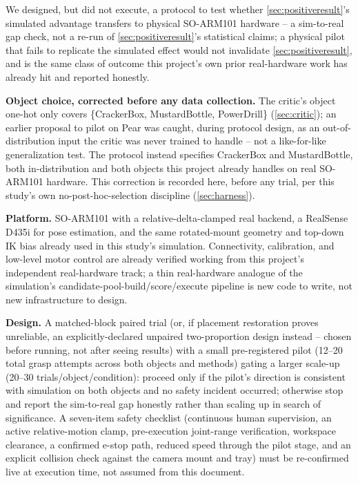 \documentclass[journal]{IEEEtran}
\begin{document}
We designed, but did not execute, a protocol to test whether
\cref{sec:positiveresult}'s simulated advantage transfers to physical
SO-ARM101 hardware -- a sim-to-real gap check, not a re-run of
\cref{sec:positiveresult}'s statistical claims; a physical pilot that fails
to replicate the simulated effect would not invalidate
\cref{sec:positiveresult}, and is the same class of outcome this project's
own prior real-hardware work has already hit and reported honestly.

\textbf{Object choice, corrected before any data collection.} The critic's
object one-hot only covers \{CrackerBox, MustardBottle, PowerDrill\}
(\cref{sec:critic}); an earlier proposal to pilot on Pear was caught,
during protocol design, as an out-of-distribution input the critic was
never trained to handle -- not a like-for-like generalization test. The
protocol instead specifies CrackerBox and MustardBottle, both
in-distribution and both objects this project already handles on real
SO-ARM101 hardware. This correction is recorded here, before any trial, per
this study's own no-post-hoc-selection discipline (\cref{sec:harness}).

\textbf{Platform.} SO-ARM101 with a relative-delta-clamped real backend, a
RealSense D435i for pose estimation, and the same rotated-mount geometry
and top-down IK bias already used in this study's simulation. Connectivity,
calibration, and low-level motor control are already verified working from
this project's independent real-hardware track; a thin real-hardware
analogue of the simulation's candidate-pool-build/score/execute pipeline is
new code to write, not new infrastructure to design.

\textbf{Design.} A matched-block paired trial (or, if placement restoration
proves unreliable, an explicitly-declared unpaired two-proportion design
instead -- chosen before running, not after seeing results) with a small
pre-registered pilot (12--20 total grasp attempts across both objects and
methods) gating a larger scale-up (20--30 trials/object/condition): proceed
only if the pilot's direction is consistent with simulation on both objects
and no safety incident occurred; otherwise stop and report the sim-to-real
gap honestly rather than scaling up in search of significance. A
seven-item safety checklist (continuous human supervision, an active
relative-motion clamp, pre-execution joint-range verification, workspace
clearance, a confirmed e-stop path, reduced speed through the pilot stage,
and an explicit collision check against the camera mount and tray) must be
re-confirmed live at execution time, not assumed from this document.
\end{document}
